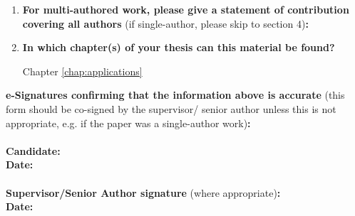 {\begin{enumerate}[leftmargin=*,label={\bfseries\arabic*.}]
\begin{enumerate}[label={\alph*)}]
	N/A
	\item \textbf{List the manuscript's authors in the intended authorship order:}

	\citeauthor*{Young2022a}
	\item \textbf{Stage of publication:}

	Work presented at conference, no proceedings published.
\end{enumerate}

\item \textbf{For multi-authored work, please give a statement of contribution covering all authors} (if single-author, please skip to section 4)\textbf{:}
\item \textbf{In which chapter(s) of your thesis can this material be found?}

Chapter \ref{chap:applications}
\end{enumerate}

\textbf{e-Signatures confirming that the information above is accurate}
(this form should be co-signed by the supervisor/ senior author unless this is not appropriate, e.g. if the paper was a single-author work)\textbf{:}\\
\textbf{}\\
\textbf{Candidate:}\\
\textbf{Date:}\\
\textbf{}\\
\textbf{Supervisor/Senior Author signature} (where appropriate)\textbf{:}\\
\textbf{Date:}
%
}%
